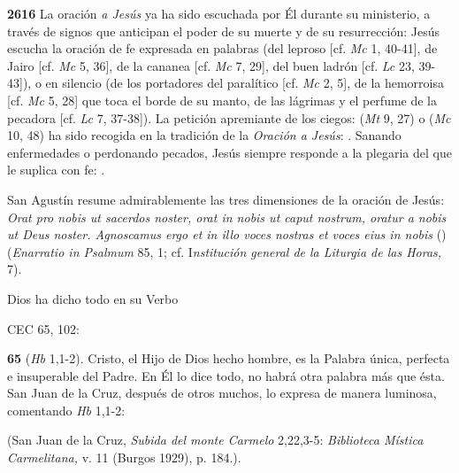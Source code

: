 \textbf{2616} La oración \emph{a Jesús} ya ha sido escuchada por Él durante su ministerio, a través de signos que anticipan el poder de su muerte y de su resurrección: Jesús escucha la oración de fe expresada en palabras (del leproso {[}cf. \emph{Mc} 1, 40-41{]}, de Jairo {[}cf. \emph{Mc} 5, 36{]}, de la cananea {[}cf. \emph{Mc} 7, 29{]}, del buen ladrón {[}cf. \emph{Lc} 23, 39-43{]}), o en silencio (de los portadores del paralítico {[}cf. \emph{Mc} 2, 5{]}, de la hemorroisa {[}cf. \emph{Mc} 5, 28{]} que toca el borde de su manto, de las lágrimas y el perfume de la pecadora {[}cf. \emph{Lc} 7, 37-38{]}). La petición apremiante de los ciegos:  (\emph{Mt} 9, 27) o  (\emph{Mc} 10, 48) ha sido recogida en la tradición de la \emph{Oración a Jesús}: . Sanando enfermedades o perdonando pecados, Jesús siempre responde a la plegaria del que le suplica con fe: .

San Agustín resume admirablemente las tres dimensiones de la oración de Jesús: \emph{Orat pro nobis ut sacerdos noster, orat in nobis ut caput nostrum, oratur a nobis ut Deus noster. Agnoscamus ergo et in illo voces nostras et voces eius in nobis} () (\emph{Enarratio in Psalmum} 85, 1; cf. I\emph{nstitución general de la Liturgia de las Horas,} 7).

Dios ha dicho todo en su Verbo

CEC 65, 102:

\textbf{65}  (\emph{Hb} 1,1-2). Cristo, el Hijo de Dios hecho hombre, es la Palabra única, perfecta e insuperable del Padre. En Él lo dice todo, no habrá otra palabra más que ésta. San Juan de la Cruz, después de otros muchos, lo expresa de manera luminosa, comentando \emph{Hb} 1,1-2:

 (San Juan de la Cruz, \emph{Subida del monte Carmelo} 2,22,3-5: \emph{Biblioteca Mística Carmelitana,} v. 11 (Burgos 1929), p. 184.).

